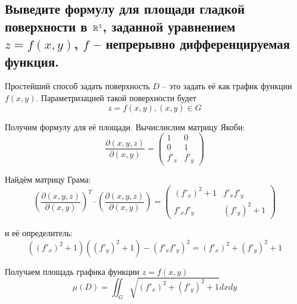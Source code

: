 \subsection{Выведите формулу для площади гладкой поверхности в $\mathbb{R}^3$, заданной уравнением $z = f(x, y)$, $f$ -- непрерывно дифференцируемая функция.}

Простейший способ задать поверхность $D$ -- это задать её как график функции $f(x, y)$. Параметризацией такой поверхности будет
\[ z = f(x, y), (x, y) \in G \]

Получим формулу для её площади. Вычислислим матрицу Якоби:
\[ \dfrac{\partial(x, y, z)}{\partial(x, y)} =
\begin{pmatrix}
    1      & 0\\
    0      & 1\\
    f'_{x} & f'_{y}
\end{pmatrix}
\]

Найдём матрицу Грама:
\[ \left(\dfrac{\partial(x, y, z)}{\partial(x, y)}\right)^T \cdot \left(\dfrac{\partial(x, y, z)}{\partial(x, y)}\right) = 
\begin{pmatrix}
    (f'_{x})^2 + 1 & f'_{x}f'_{y}\\
    f'_{x}f'_{y}   & (f'_{y})^2 + 1
\end{pmatrix}
\]

и её определитель:
\[ ((f'_{x})^2 + 1)((f'_{y})^2 + 1) - (f'_{x}f'_{y})^2 = (f'_{x})^2 + (f'_{y})^2 + 1 \]

Получаем площадь графика функции $z = f(x, y)$
\[ \mu(D) = \iint_{G} \sqrt{(f'_{x})^2 + (f'_{y})^2 + 1} dxdy \]